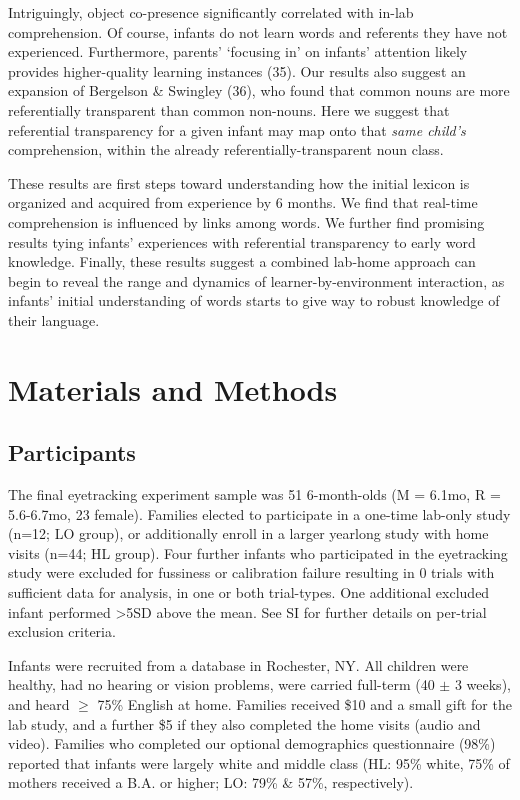 \documentclass[9pt,twocolumn,twoside,]{pnas-new}
\begin{document}
Intriguingly, object co-presence significantly correlated with in-lab
comprehension. Of course, infants do not learn words and referents they
have not experienced. Furthermore, parents' `focusing in' on infants'
attention likely provides higher-quality learning instances (35). Our
results also suggest an expansion of Bergelson \& Swingley (36), who
found that common nouns are more referentially transparent than common
non-nouns. Here we suggest that referential transparency for a given
infant may map onto that \emph{same child's} comprehension, within the
already referentially-transparent noun class.

These results are first steps toward understanding how the initial
lexicon is organized and acquired from experience by 6 months. We find
that real-time comprehension is influenced by links among words. We
further find promising results tying infants' experiences with
referential transparency to early word knowledge. Finally, these results
suggest a combined lab-home approach can begin to reveal the range and
dynamics of learner-by-environment interaction, as infants' initial
understanding of words starts to give way to robust knowledge of their
language.

\section*{Materials and Methods}\label{matmethods}

\subsection*{Participants}\label{participants}

The final eyetracking experiment sample was 51 6-month-olds (M = 6.1mo,
R = 5.6-6.7mo, 23 female). Families elected to participate in a one-time
lab-only study (n=12; LO group), or additionally enroll in a larger
yearlong study with home visits (n=44; HL group). Four further infants
who participated in the eyetracking study were excluded for fussiness or
calibration failure resulting in 0 trials with sufficient data for
analysis, in one or both trial-types. One additional excluded infant
performed \textgreater{}5SD above the mean. See SI for further details
on per-trial exclusion criteria.

Infants were recruited from a database in Rochester, NY. All children
were healthy, had no hearing or vision problems, were carried full-term
(40 \(\pm\) 3 weeks), and heard \(\geq\) 75\% English at home. Families
received \$10 and a small gift for the lab study, and a further \$5 if
they also completed the home visits (audio and video). Families who
completed our optional demographics questionnaire (98\%) reported that
infants were largely white and middle class (HL: 95\% white, 75\% of
mothers received a B.A. or higher; LO: 79\% \& 57\%, respectively).
\end{document}
